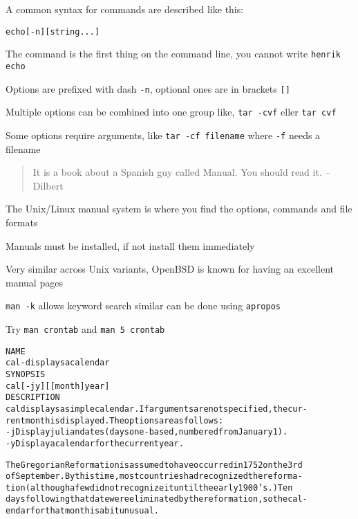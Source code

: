 \documentclass[Screen16to9,17pt]{foils}
\begin{document}

A common syntax for commands are described like this:
\begin{alltt}
echo [-n] [string ...]
\end{alltt}

\begin{list2}
\item The command is the first thing on the command line, you cannot write \verb+henrik echo+
\item Options are prefixed with dash \verb+-n+, optional ones are in brackets  \verb+[]+
\item Multiple options can be combined into one group like, \verb+tar -cvf+ eller \verb+tar cvf+
\item Some options require arguments, like \verb+tar -cf filename+ where \verb+-f+ needs a filename
\end{list2}





\begin{quote}
 It is a book about a Spanish guy called Manual. You should read it.
       -- Dilbert
\end{quote}

\begin{list1}
\item The Unix/Linux manual system is where you find the options, commands and file formats
\item Manuals must be installed, if not install them immediately
\item Very similar across Unix variants, OpenBSD is known for having an excellent manual pages
\item \verb+man -k+ allows keyword search similar can be done using \verb+apropos+
\end{list1}

Try \verb+man crontab+ and \verb+man 5 crontab+




\begin{alltt}\footnotesize
\small
NAME
     cal - displays a calendar
SYNOPSIS
     cal [-jy] [[month]  year]
DESCRIPTION
   cal displays a simple calendar.  If arguments are not specified, the cur-
   rent month is displayed.  The options are as follows:
   -j      Display julian dates (days one-based, numbered from January 1).
   -y      Display a calendar for the current year.

The Gregorian Reformation is assumed to have occurred in 1752 on the 3rd
of September.  By this time, most countries had recognized the reforma-
tion (although a few did not recognize it until the early 1900's.)  Ten
days following that date were eliminated by the reformation, so the cal-
endar for that month is a bit unusual.
\end{alltt}
\end{document}
